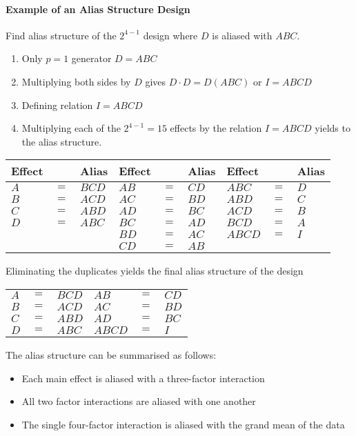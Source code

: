 \documentclass[11pt]{article}
\theoremstyle{definition}
\begin{document}
\paragraph{Example of an Alias Structure Design} Find alias structure of the $2^{4 - 1}$ design where $D$ is aliased with $ABC$.
\begin{enumerate}
	\item Only $p = 1$ generator $D = ABC$
	\item Multiplying both sides by $D$ gives $D \cdot D = D(ABC)$ or $I = ABCD$
	\item Defining relation $I = ABCD$
	\item Multiplying each of the $2^{4-1} = 15$ effects by the relation $I = ABCD$ yields to the alias structure.
\end{enumerate}
\begin{tabularx}{\linewidth}{l c l l c l l c l}
	Effect & & Alias & Effect & & Alias & Effect & & Alias \\
	\hline
	$A$ & $=$ & $BCD$ & $AB$ & $=$ & $CD$ & $ABC$ & $=$ & $D$ \\
	$B$ & $=$ & $ACD$ & $AC$ & $=$ & $BD$ & $ABD$ & $=$ & $C$ \\
	$C$ & $=$ & $ABD$ & $AD$ & $=$ & $BC$ & $ACD$ & $=$ & $B$ \\
	$D$ & $=$ & $ABC$ & $BC$ & $=$ & $AD$ & $BCD$ & $=$ & $A$ \\
	    &     &       & $BD$ & $=$ & $AC$ & $ABCD$ &$=$ & $I$ \\
	    &     &       & $CD$ & $=$ & $AB$ &
\end{tabularx}
Eliminating the duplicates yields the final alias structure of the design
\begin{tabularx}{\linewidth}{l c l l c l }
	$A$ & $=$ & $BCD$ & $AB$ & $=$ & $CD$ \\
	$B$ & $=$ & $ACD$ & $AC$ & $=$ & $BD$ \\
	$C$ & $=$ & $ABD$ & $AD$ & $=$ & $BC$ \\
	$D$ & $=$ & $ABC$ & $ABCD$ & $=$ & $I$
\end{tabularx}
The alias structure can be summarised as follows:
\begin{itemize}[nosep]
	\item Each main effect is aliased with a three-factor interaction
	\item All two factor interactions are aliased with one another
	\item The single four-factor interaction is aliased with the grand mean of the data
\end{itemize}
\end{document}
